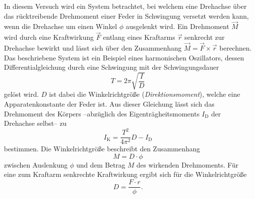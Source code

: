 In diesem Versuch wird ein System betrachtet, bei welchem eine Drehachse über das rücktreibende Drehmoment einer Feder in Schwingung versetzt werden kann, wenn die Drehachse
um einen Winkel $\phi$ ausgelenkt wird. Ein Drehmoment $\vec{M}$ wird durch eine Kraftwirkung $\vec{F}$ entlang eines Kraftarms $\vec{r}$ senkrecht zur Drehachse bewirkt und 
lässt sich über den Zusammenhang $\vec{M} = \vec{F} \times \vec{r}$ berechnen.
Das beschriebene System ist ein Beispiel eines harmonischen Oszillators, dessen Differentialgleichung durch eine Schwingung mit der Schwingungsdauer 
\begin{equation}
    \label{eqn:Schwingungsdauer}
    T = 2\pi \sqrt{\frac{I}{D}}
\end{equation}
gelöst wird. $D$ ist dabei die Winkelrichtgröße (\textit{Direktionsmoment}), welche eine Apparatenkonstante der Feder ist. Aus dieser Gleichung lässt sich das 
Drehmoment des Körpers --abzüglich des Eigenträgheitsmoments $I_\text{D}$ der Drehachse selbst-- zu
\begin{equation}
    \label{eqn:I_K}
    I_\text{K} = \frac{T^2}{4\pi^2}D - I_\text{D}
\end{equation}
bestimmen.
Die Winkelrichtgröße beschreibt den Zusammenhang 
\begin{equation*}
    M = D \cdot \phi
\end{equation*}
zwischen Auslenkung $\phi$ und dem Betrag $M$ des wirkenden Drehmoments. Für eine zum Kraftarm senkrechte Kraftwirkung ergibt sich für die Winkelrichtgröße
\begin{equation}
    \label{eqn:Winkelrichtgröße}
    D = \frac{F \cdot r}{\phi}.
\end{equation}
